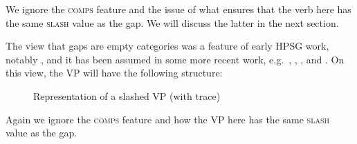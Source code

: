 \documentclass[output=paper,biblatex,babelshorthands,newtxmath,draftmode,colorlinks,citecolor=brown]{langscibook}
\begin{document}
\noindent
We ignore the \textsc{comps} feature and the issue of what ensures that the verb
here has the same \textsc{slash} value as the gap. We will discuss the latter in
the next section.

The view that gaps are empty categories was a feature of early HPSG
work, notably \citet[Chapter~4]{Pollard:Sag:94}, and it has been assumed in some
more recent work, e.g.\ \citet[191,385]{Levine:Hukari:06}, \citet{Borsley:09a},
\citet[Section~4.2]{Borsley:13}, and \citet{Mueller:14b}. On
this view, the VP will have the following structure:

\begin{figure}
{}
    \caption{\label{fig:UDC:21}Representation of a slashed VP (with trace)}  
\end{figure}


\largerpage
\noindent
Again we ignore the \textsc{comps} feature and how the VP here has the same \textsc{slash}
value as the gap.
\end{document}

